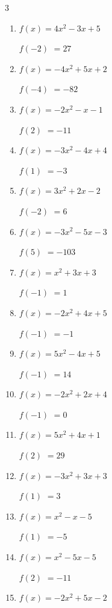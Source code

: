 \begin{multicols}{3}
\begin{enumerate}
$f(3)$
        $= 46$

\columnbreak %

\resetques

  \item $f(x)=4x^{2}-3x+5$

$f(-2)$
        $= 27$

  \item $f(x)=-4x^{2}+5x+2$

$f(-4)$
        $= -82$

  \item $f(x)=-2x^{2}-x-1$

$f(2)$
        $= -11$

  \item $f(x)=-3x^{2}-4x+4$

$f(1)$
        $= -3$

  \item $f(x)=3x^{2}+2x-2$

$f(-2)$
        $= 6$

  \item $f(x)=-3x^{2}-5x-3$

$f(5)$
        $= -103$

  \item $f(x)=x^{2}+3x+3$

$f(-1)$
        $= 1$

  \item $f(x)=-2x^{2}+4x+5$

$f(-1)$
        $= -1$

  \item $f(x)=5x^{2}-4x+5$

$f(-1)$
        $= 14$

  \item $f(x)=-2x^{2}+2x+4$

$f(-1)$
        $= 0$

  \item $f(x)=5x^{2}+4x+1$

$f(2)$
        $= 29$

  \item $f(x)=-3x^{2}+3x+3$

$f(1)$
        $= 3$

  \item $f(x)=x^{2}-x-5$

$f(1)$
        $= -5$

  \item $f(x)=x^{2}-5x-5$

$f(2)$
        $= -11$

  \item $f(x)=-2x^{2}+5x-2$


\end{enumerate}
\end{multicols}
